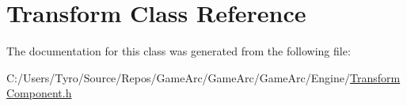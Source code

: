 \hypertarget{class_transform}{}\section{Transform Class Reference}
\label{class_transform}


The documentation for this class was generated from the following file\+:\begin{DoxyCompactItemize}
\item 
C\+:/\+Users/\+Tyro/\+Source/\+Repos/\+Game\+Arc/\+Game\+Arc/\+Game\+Arc/\+Engine/\mbox{\hyperlink{_transform_component_8h}{Transform\+Component.\+h}}\end{DoxyCompactItemize}
